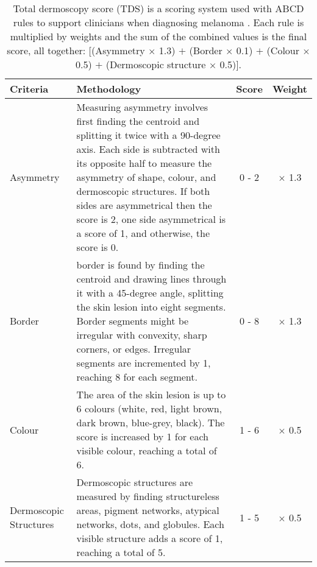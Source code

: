 \begin{table}
\small
\begin{tabular}{|p{2.5cm}|p{10cm}|c|c|}
	\hline
	Criteria & Methodology & Score & Weight \\
	\hline
	Asymmetry & Measuring asymmetry involves first finding the centroid and splitting it twice with a 90-degree axis. Each side is subtracted with its opposite half to measure the asymmetry of shape, colour, and dermoscopic structures. If both sides are asymmetrical then the score is 2, one side asymmetrical is a score of 1, and otherwise, the score is 0. & 0 - 2 & $\times$ 1.3 
	\\
	\hline
	Border & border is found by finding the centroid and drawing lines through it with a 45-degree angle, splitting the skin lesion into eight segments. Border segments might be irregular with convexity, sharp corners, or edges. Irregular segments are incremented by 1, reaching 8 for each segment.  & 0 - 8 & $\times$ 1.3 
	\\
	\hline
	Colour & The area of the skin lesion is up to 6 colours (white, red, light brown, dark brown, blue-grey, black). The score is increased by 1 for each visible colour, reaching a total of 6. & 1 - 6 & $\times$ 0.5 
	\\
	\hline
	Dermoscopic Structures & Dermoscopic structures are measured by finding structureless areas, pigment networks, atypical networks, dots, and globules. Each visible structure adds a score of 1, reaching a total of 5. & 1 - 5 & $\times$ 0.5 
	\\
	\hline	
\end{tabular}
\caption{Total dermoscopy score (TDS) is a scoring system used with ABCD rules to support clinicians when diagnosing melanoma \cite{Cognetta1994}. Each rule is multiplied by weights and the sum of the combined values is the final score, all together: [(Asymmetry $\times$ 1.3) $+$ (Border $\times$ 0.1) $+$ (Colour $\times$ 0.5) $+$ (Dermoscopic structure $\times$ 0.5)].}
\end{table} \label{TDS}

